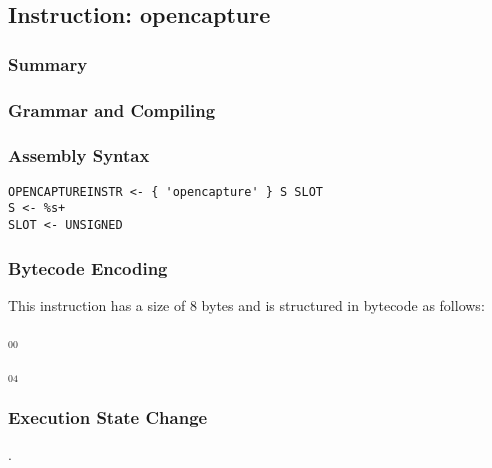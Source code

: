 \subsection{Instruction: opencapture}

\subsubsection{Summary}


\subsubsection{Grammar and Compiling}


\subsubsection{Assembly Syntax}

\begin{myquote}
\begin{verbatim}
OPENCAPTUREINSTR <- { 'opencapture' } S SLOT
S <- %s+
SLOT <- UNSIGNED
\end{verbatim}
\end{myquote}

\subsubsection{Bytecode Encoding}

This instruction has a size of 8 bytes and is structured in bytecode as follows:

$_{00}$\ 



$_{04}$\ 


\subsubsection{Execution State Change}

.


